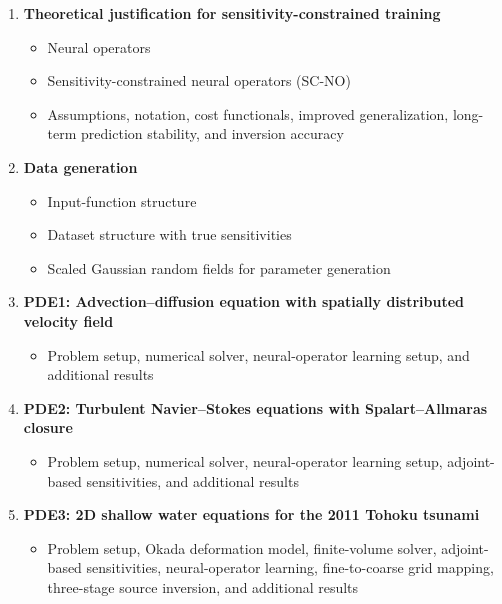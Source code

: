 \begin{enumerate}
    \item \textbf{Theoretical justification for sensitivity-constrained training}
    \begin{itemize}
        \item Neural operators
        \item Sensitivity-constrained neural operators (SC-NO)
        \item Assumptions, notation, cost functionals, improved generalization, long-term prediction stability, and inversion accuracy
    \end{itemize}

    \item \textbf{Data generation}
    \begin{itemize}
        \item Input-function structure
        \item Dataset structure with true sensitivities
        \item Scaled Gaussian random fields for parameter generation
    \end{itemize}

    \item \textbf{PDE1: Advection--diffusion equation with spatially distributed velocity field}
    \begin{itemize}
        \item Problem setup, numerical solver, neural-operator learning setup, and additional results
    \end{itemize}

    \item \textbf{PDE2: Turbulent Navier--Stokes equations with Spalart--Allmaras closure}
    \begin{itemize}
        \item Problem setup, numerical solver, neural-operator learning setup, adjoint-based sensitivities, and additional results
    \end{itemize}

    \item \textbf{PDE3: 2D shallow water equations for the 2011 Tohoku tsunami}
    \begin{itemize}
        \item Problem setup, Okada deformation model, finite-volume solver, adjoint-based sensitivities, neural-operator learning, fine-to-coarse grid mapping, three-stage source inversion, and additional results
    \end{itemize}


\end{enumerate}
